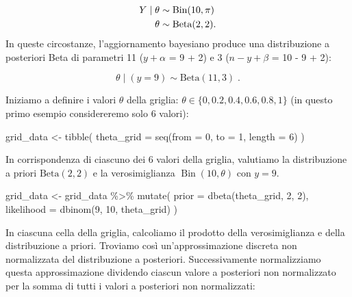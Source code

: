 \documentclass[
]{memoir}
\newenvironment{Shaded}{\begin{snugshade}}{\end{snugshade}}
\newcommand{\AttributeTok}[1]{\textcolor[rgb]{0.77,0.63,0.00}{#1}}
\newcommand{\DecValTok}[1]{\textcolor[rgb]{0.00,0.00,0.81}{#1}}
\newcommand{\FunctionTok}[1]{\textcolor[rgb]{0.00,0.00,0.00}{#1}}
\newcommand{\NormalTok}[1]{#1}
\newcommand{\OtherTok}[1]{\textcolor[rgb]{0.56,0.35,0.01}{#1}}
\newcommand{\SpecialCharTok}[1]{\textcolor[rgb]{0.00,0.00,0.00}{#1}}
\DeclareMathOperator{\Bin}{Bin} %
\begin{document}
\begin{align}
Y \mid \theta & \sim \text{Bin}(10, \pi) \notag\\
\theta & \sim \mbox{Beta}(2, 2).
\end{align}
In queste circostanze, l'aggiornamento bayesiano produce una distribuzione a posteriori Beta di parametri 11 (\(y + \alpha\) = 9 + 2) e 3 (\(n - y + \beta\) = 10 - 9 + 2):

\begin{equation}
\theta \mid (y = 9) \sim \mbox{Beta}(11, 3) \; .
\end{equation}

Iniziamo a definire i valori \(\theta\) della griglia: \(\theta \in \{0, 0.2, 0.4, 0.6, 0.8, 1\}\) (in questo primo esempio considereremo solo 6 valori):

\begin{Shaded}
\begin{Highlighting}[]
\NormalTok{grid\_data }\OtherTok{\textless{}{-}} \FunctionTok{tibble}\NormalTok{(}
  \AttributeTok{theta\_grid =} \FunctionTok{seq}\NormalTok{(}\AttributeTok{from =} \DecValTok{0}\NormalTok{, }\AttributeTok{to =} \DecValTok{1}\NormalTok{, }\AttributeTok{length =} \DecValTok{6}\NormalTok{)}
\NormalTok{)}
\end{Highlighting}
\end{Shaded}

\noindent
In corrispondenza di ciascuno dei 6 valori della griglia, valutiamo la distribuzione a priori \(\mbox{Beta}(2, 2)\) e la verosimiglianza \(\Bin(10, \theta)\) con \(y = 9\).

\begin{Shaded}
\begin{Highlighting}[]
\NormalTok{grid\_data }\OtherTok{\textless{}{-}}\NormalTok{ grid\_data }\SpecialCharTok{\%\textgreater{}\%}
  \FunctionTok{mutate}\NormalTok{(}
    \AttributeTok{prior =} \FunctionTok{dbeta}\NormalTok{(theta\_grid, }\DecValTok{2}\NormalTok{, }\DecValTok{2}\NormalTok{),}
    \AttributeTok{likelihood =} \FunctionTok{dbinom}\NormalTok{(}\DecValTok{9}\NormalTok{, }\DecValTok{10}\NormalTok{, theta\_grid)}
\NormalTok{  )}
\end{Highlighting}
\end{Shaded}

\noindent
In ciascuna cella della griglia, calcoliamo il prodotto della verosimiglianza e della distribuzione a priori. Troviamo così un'approssimazione discreta non normalizzata del distribuzione a posteriori. Successivamente normalizziamo questa approssimazione dividendo ciascun valore a posteriori non normalizzato per la somma di tutti i valori a posteriori non normalizzati:
\end{document}
